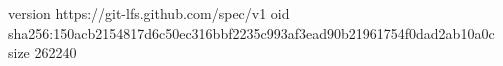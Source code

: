 version https://git-lfs.github.com/spec/v1
oid sha256:150acb2154817d6c50ec316bbf2235c993af3ead90b21961754f0dad2ab10a0c
size 262240
